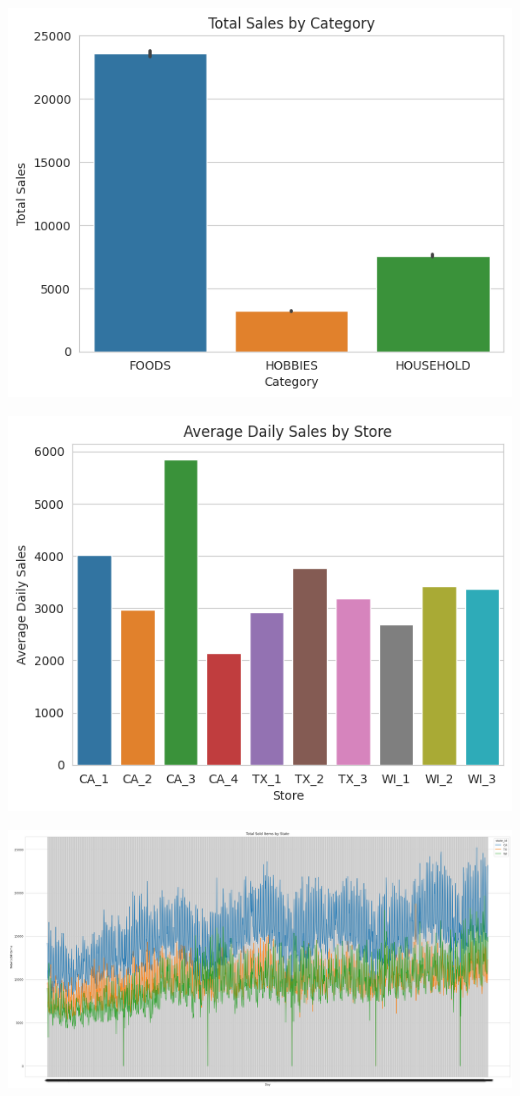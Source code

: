 \documentclass[fleqn,10pt]{SelfArx} %
\begin{document}
\includegraphics[scale=0.5]{32.png}

\includegraphics[scale=0.5]{33.png}

\includegraphics[scale=0.1]{34.png}
\end{document}
